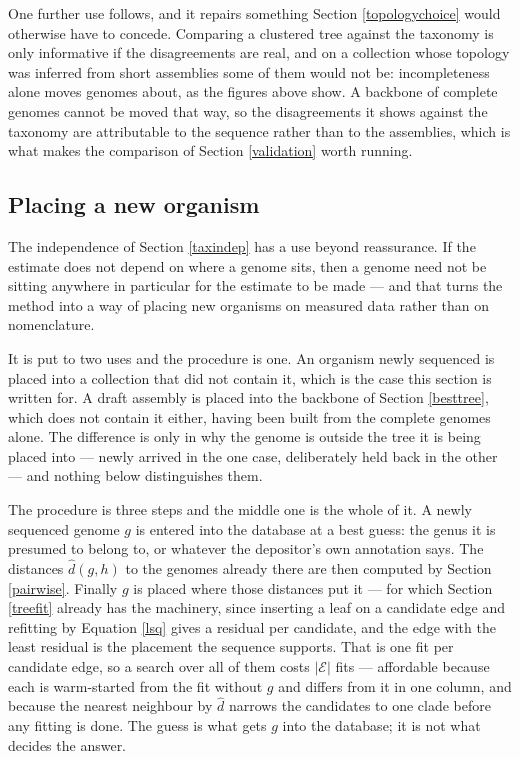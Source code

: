 \documentclass[pdflatex,sn-vancouver-num]{sn-jnl}
\begin{document}
One further use follows, and it repairs something Section \ref{topologychoice} would otherwise have to
concede. Comparing a clustered tree against the taxonomy is only informative if the disagreements are
real, and on a collection whose topology was inferred from short assemblies some of them would not be:
incompleteness alone moves genomes about, as the figures above show. A backbone of complete genomes
cannot be moved that way, so the disagreements it shows against the taxonomy are attributable to the
sequence rather than to the assemblies, which is what makes the comparison of
Section \ref{validation} worth running.

\subsection{Placing a new organism}\label{placing}

The independence of Section \ref{taxindep} has a use beyond reassurance. If the estimate does not
depend on where a genome sits, then a genome need not be sitting anywhere in particular for the
estimate to be made --- and that turns the method into a way of placing new organisms on measured
data rather than on nomenclature.

It is put to two uses and the procedure is one. An organism newly sequenced is placed into a
collection that did not contain it, which is the case this section is written for. A draft assembly is
placed into the backbone of Section \ref{besttree}, which does not contain it either, having been
built from the complete genomes alone. The difference is only in why the genome is outside the tree it
is being placed into --- newly arrived in the one case, deliberately held back in the other --- and
nothing below distinguishes them.

The procedure is three steps and the middle one is the whole of it. A newly sequenced genome $g$ is
entered into the database at a best guess: the genus it is presumed to belong to, or whatever the
depositor's own annotation says. The distances $\widehat{d}(g,h)$ to the genomes already there are
then computed by Section \ref{pairwise}. Finally $g$ is placed where those distances put it --- for
which Section \ref{treefit} already has the machinery, since inserting a leaf on a candidate edge and
refitting by Equation \eqref{lsq} gives a residual per candidate, and the edge with the least residual
is the placement the sequence supports. That is one fit per candidate edge, so a search over all of
them costs $\lvert \mathcal{E} \rvert$ fits --- affordable because each is warm-started from the fit
without $g$ and differs from it in one column, and because the nearest neighbour by $\widehat{d}$
narrows the candidates to one clade before any fitting is done. The guess is what gets $g$ into the database; it is not what
decides the answer.
\end{document}
